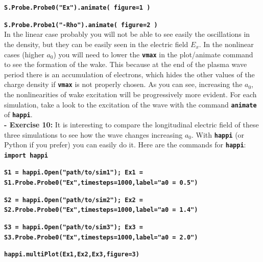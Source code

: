 \documentclass{article}
\newcommand{\commandline}[1]{\texttt{\textbf{#1}}}
\begin{document}
\commandline{S.Probe.Probe0("Ex").animate( figure=1 )}

\commandline{S.Probe.Probe1("-Rho").animate( figure=2 )}\\

In the linear case probably you will not be able to see easily the oscillations in the density, but they can be easily seen in the electric field $E_x$. In the nonlinear cases (higher $a_0$) you will need to lower the \commandline{vmax} in the plot/animate command to see the formation of  the wake. This because at the end of the plasma wave period there is an accumulation of electrons, which hides the other values of the charge density if \commandline{vmax}  is not properly chosen.
As you can see, increasing the $a_0$, the nonlinearities of wake excitation will be progressively more evident. For each simulation, take a look to the excitation of the wave with the command \commandline{animate} of \commandline{happi}.\\

\textbf{ - Exercise 10:} It is interesting to compare the longitudinal electric field of these three simulations to see how the wave changes increasing $a_0$. With \commandline{happi} (or Python if you prefer) you can easily do it. Here are the commands for \commandline{happi}:\\

\commandline{import happi}

\small{\commandline{S1 = happi.Open("path/to/sim1"); Ex1 = S1.Probe.Probe0("Ex",timesteps=1000,label="a0 = 0.5")}}

\commandline{S2 = happi.Open("path/to/sim2"); Ex2 = S2.Probe.Probe0("Ex",timesteps=1000,label="a0 = 1.4")}

\commandline{S3 = happi.Open("path/to/sim3"); Ex3 = S3.Probe.Probe0("Ex",timesteps=1000,label="a0 = 2.0")}

\commandline{happi.multiPlot(Ex1,Ex2,Ex3,figure=3)}
\end{document}

